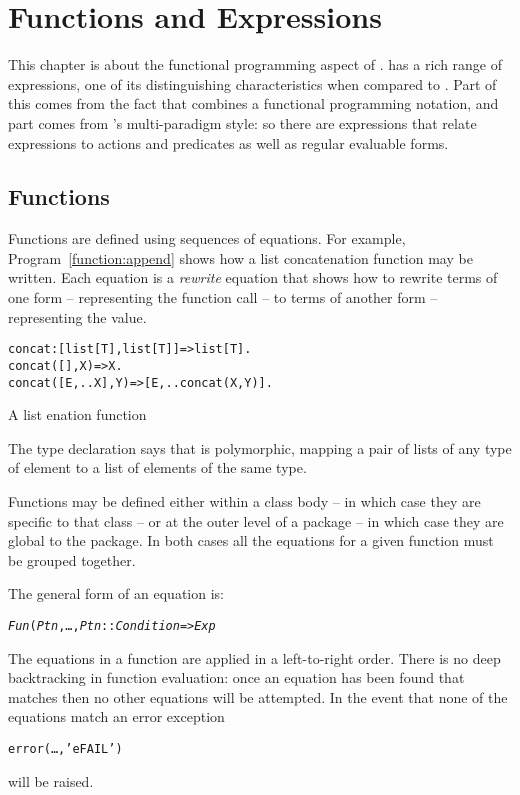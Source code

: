\chapter{Functions and Expressions}
\label{expressions}

This chapter is about the functional programming aspect of \go. \go has a rich range of expressions, one of its distinguishing characteristics when compared to \prolog. Part of this comes from the fact that \go combines a functional programming notation, and part comes from \go's multi-paradigm style: so there are expressions that relate expressions to actions and predicates as well as regular evaluable forms.

\section{Functions}
\label{expression:functions}

Functions are defined using sequences of equations. For example, Program~\vref{function:append} shows how a list concatenation function may be written. Each equation is a \emph{rewrite} equation that shows how to rewrite terms of one form -- representing the function call -- to terms of another form -- representing the value.
\begin{program}
\begin{boxed}
\begin{alltt}
concat:[list[T],list[T]]=>list[T].
concat([],X) => X.
concat([E,..X],Y) => [E,.. concat(X,Y)].
\end{alltt}
\end{boxed}
\caption{\label{function:append}A list enation function}
\end{program}
The type declaration says that  is polymorphic, mapping a pair of lists of any type of element  to a list of elements of the same type.

Functions may be defined either within a class body -- in which case they are specific to that class -- or at the outer level of a package -- in which case they are global to the package. In both cases all the equations for a given function must be grouped together.

The general form of an equation is:
\begin{alltt}
\emph{Fun}(\emph{Ptn},\ldots,\emph{Ptn\subn} :: \emph{Condition} => \emph{Exp}
\end{alltt}
The equations in a function are applied in a left-to-right order. There is no deep backtracking in function evaluation: once an equation has been found that matches then no other equations will be attempted. In the event that none of the equations match an error exception
\begin{alltt}
error(\ldots,'eFAIL')
\end{alltt}
will be raised.

